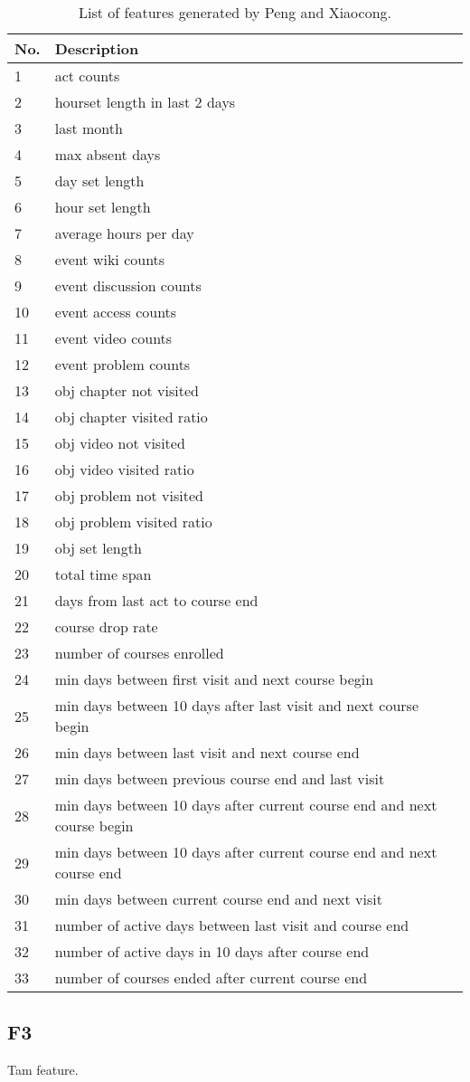 \begin{center}
  \begin{table*}[ht]
    \begin{minipage}{\textwidth}
    {
      \small
      \hfill{}
      \begin{tabular}{|l|l|}
      \hline
      \textbf{No.}&\textbf{Description}\tabularnewline \hline
1 & act counts \tabularnewline
2 & hourset length in last 2 days \tabularnewline
3 & last month \tabularnewline
4 & max absent days \tabularnewline
5 & day set length \tabularnewline
6 & hour set length \tabularnewline
7 & average hours per day \tabularnewline
8 & event wiki counts \tabularnewline
9 & event discussion counts \tabularnewline
10 & event access counts \tabularnewline
11 & event video counts \tabularnewline
12 & event problem counts \tabularnewline
13 & obj chapter not visited \tabularnewline
14 & obj chapter visited ratio \tabularnewline
15 & obj video not visited \tabularnewline
16 & obj video visited ratio \tabularnewline
17 & obj problem not visited \tabularnewline
18 & obj problem visited ratio \tabularnewline
19 & obj set length \tabularnewline
20 & total time span \tabularnewline
21 & days from last act to course end \tabularnewline
22 & course drop rate \tabularnewline
23 & number of courses enrolled \tabularnewline
24 & min days between first visit and next course begin \tabularnewline
25 & min days between 10 days after last visit and next course begin \tabularnewline
26 & min days between last visit and next course end \tabularnewline
27 & min days between previous course end and last visit \tabularnewline
28 & min days between 10 days after current course end and next course begin \tabularnewline
29 & min days between 10 days after current course end and next course end \tabularnewline
30 & min days between current course end and next visit \tabularnewline
31 & number of active days between last visit and course end \tabularnewline
32 & number of active days in 10 days after course end \tabularnewline
33 & number of courses ended after current course end \tabularnewline
      \hline
      \end{tabular}
    }
    \hfill{}
    \caption{List of features generated by Peng and Xiaocong.}
    \label{tb:rwfeature}
    \end{minipage}
  \end{table*}
\end{center}

\subsection{F3}
Tam feature.

